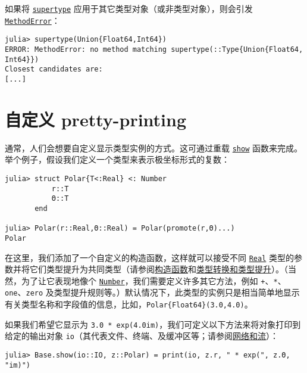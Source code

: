 如果将 \hyperlink{12192788431675298651}{\texttt{supertype}} 应用于其它类型对象（或非类型对象），则会引发 \hyperlink{68769522931907606}{\texttt{MethodError}}：




\begin{verbatim}
julia> supertype(Union{Float64,Int64})
ERROR: MethodError: no method matching supertype(::Type{Union{Float64, Int64}})
Closest candidates are:
[...]
\end{verbatim}



\hypertarget{10200728548672135026}{}


\section{自定义 pretty-printing}



通常，人们会想要自定义显示类型实例的方式。这可通过重载 \hyperlink{4561869563484222675}{\texttt{show}} 函数来完成。举个例子，假设我们定义一个类型来表示极坐标形式的复数：




\begin{verbatim}
julia> struct Polar{T<:Real} <: Number
           r::T
           Θ::T
       end

julia> Polar(r::Real,Θ::Real) = Polar(promote(r,Θ)...)
Polar
\end{verbatim}



在这里，我们添加了一个自定义的构造函数，这样就可以接受不同 \hyperlink{6175959395021454412}{\texttt{Real}} 类型的参数并将它们类型提升为共同类型（请参阅\hyperlink{1489967485005487723}{构造函数}和\hyperlink{10374023657104680331}{类型转换和类型提升}）。（当然，为了让它表现地像个 \hyperlink{1990584313715697055}{\texttt{Number}}，我们需要定义许多其它方法，例如 \texttt{+}、\texttt{*}、\texttt{one}、\texttt{zero} 及类型提升规则等。）默认情况下，此类型的实例只是相当简单地显示有关类型名称和字段值的信息，比如，\texttt{Polar\{Float64\}(3.0,4.0)}。



如果我们希望它显示为 \texttt{3.0 * exp(4.0im)}，我们可定义以下方法来将对象打印到给定的输出对象 \texttt{io}（其代表文件、终端、及缓冲区等；请参阅\hyperlink{4176621353987521289}{网络和流}）：




\begin{verbatim}
julia> Base.show(io::IO, z::Polar) = print(io, z.r, " * exp(", z.Θ, "im)")
\end{verbatim}



